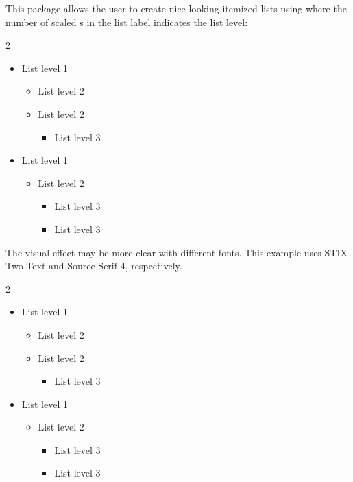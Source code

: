 \documentclass{beerydoc}
\begin{document}
This package allows the user to create nice-looking itemized lists using
 where the number of scaled s in the list
label indicates the list level:

\begin{multicols}{2}
  \begin{itemize}
    \item List level 1
    \begin{itemize}
      \item List level 2
      \item List level 2
      \begin{itemize}
        \item List level 3
      \end{itemize}
    \end{itemize}
    \item List level 1
    \begin{itemize}
      \item List level 2
      \begin{itemize}
        \item List level 3
        \item List level 3
      \end{itemize}
    \end{itemize}
  \end{itemize}
\end{multicols}

The visual effect may be more clear with different fonts.
This example uses STIX Two Text and Source Serif 4, respectively.

\begingroup
  \newfontfamilystixtwo
  \begin{multicols}{2}
    \begin{itemize}
      \item List level 1
      \begin{itemize}
        \item List level 2
        \item List level 2
        \begin{itemize}
          \item List level 3
        \end{itemize}
      \end{itemize}
      \item List level 1
      \begin{itemize}
        \item List level 2
        \begin{itemize}
          \item List level 3
          \item List level 3
        \end{itemize}
      \end{itemize}
    \end{itemize}
  \end{multicols}
\endgroup
\end{document}

